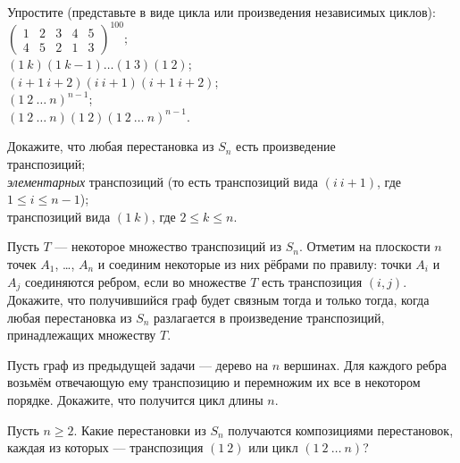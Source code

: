 \documentclass[a4paper,12pt]{article}
\begin{document}


Упростите (представьте в виде цикла или произведения независимых циклов):\\
\medskip
{}
$\begin{pmatrix}1&2&3&4&5\\4&5&2&1&3\end{pmatrix}^{100};$\\
\medskip
{} $(1\ k)(1\ k-1)\ldots (1\ 3)(1\ 2)$;\\
\medskip
{} $(i+1\ i+2)(i\ i+1)(i+1\ i+2)$;\\
\medskip
{} $(1\ 2\ \ldots\ n)^{n-1}$;\\
\medskip
{} $(1\ 2\ \ldots\ n)(1\ 2)(1\ 2\ \ldots\ n)^{n-1}$.


Докажите, что любая перестановка из $S_n$ есть произведение\\
транспозиций;\\
{\em элементарных} транспозиций (то есть транспозиций вида $(i\ i+1)$, где $1\leq i\leq n-1$);\\
транспозиций вида $(1\ k)$, где $2\leq k\leq n$.



Пусть $T$ --- некоторое множество транспозиций из $S_n$.
Отметим на плоскости $n$ точек $A_1$, \dots, $A_n$ и соединим
некоторые из них р\"ебрами по правилу: точки $A_i$ и $A_j$
соединяются ребром, если во множестве $T$ есть транспозиция $(i,j)$.
Докажите, что получившийся граф будет связным %
тогда и только тогда, когда любая перестановка из $S_n$
разлагается в произведение транспозиций, %
принадлежащих множеству $T$.

Пусть граф из предыдущей задачи --- дерево на $n$ вершинах. Для каждого ребра возьмём отвечающую ему транспозицию и перемножим их все в некотором порядке. Докажите, что получится цикл длины $n$.




 Пусть $n\geq2$. Какие перестановки из $S_n$ получаются композициями перестановок, каждая из которых --- %
транспозиция $(1\ 2)$ или цикл $(1\ 2\ \ldots\ n)$?
\end{document}
